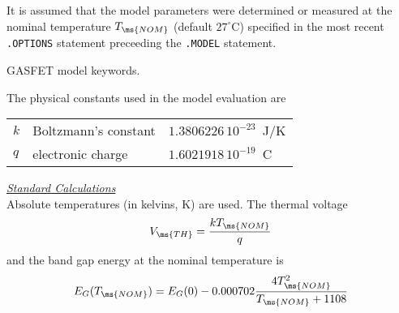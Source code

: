 It is assumed that the model parameters were determined or
measured at the nominal temperature $T_{\ms{NOM}}$ (default
$27^{\circ}$C) specified in the most recent {\tt .OPTIONS}
statement preceeding the {\tt .MODEL} statement.
\begin{table}[h]
\caption{\spicethree GASFET model keywords. \label{zsp3table}}
\end{table}
The physical constants used in the model evaluation are
\begin{center}
\begin{tabular}{|l|l|l|}
\hline
$k$ & Boltzmann's constant           &  $1.3806226\,10^{-23}$~J/K\\
$q$ & electronic charge             & $1.6021918\,10^{-19}$~C\\
\hline
\end{tabular}
\end{center}
\noindent\underline{\sl \large Standard Calculations}\\[0.1in]
Absolute temperatures (in kelvins, K) are used. The thermal
voltage
\begin{equation}
V_{\ms{TH}}={{kT_{\ms{NOM}}}\over q}
\end{equation}
\noindent and the band gap energy at the nominal temperature is
\begin{equation}
E_G(T_{\ms{NOM}})=E_G(0)-0.000702{{4T_{\ms{NOM}}^2}\over{T_{\ms{NOM}}+1108}}
\end{equation}
